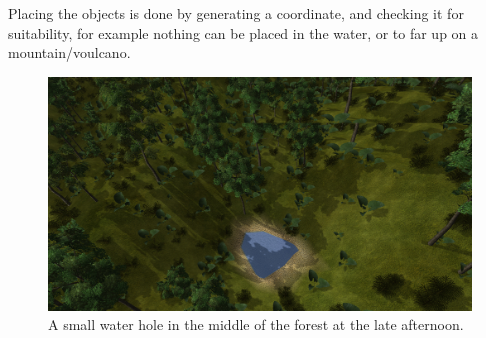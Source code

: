 Placing the objects is done by generating a coordinate, and checking it for suitability, for example nothing can be placed in the water, or to far up on a mountain/voulcano.

\begin{figure}[H]
  \centering
  \includegraphics[width=0.9\linewidth]{images/content1.jpg}
  \caption{A small water hole in the middle of the forest at the late afternoon.}
  \label{fig:water_hole}
\end{figure}%

\newpage
